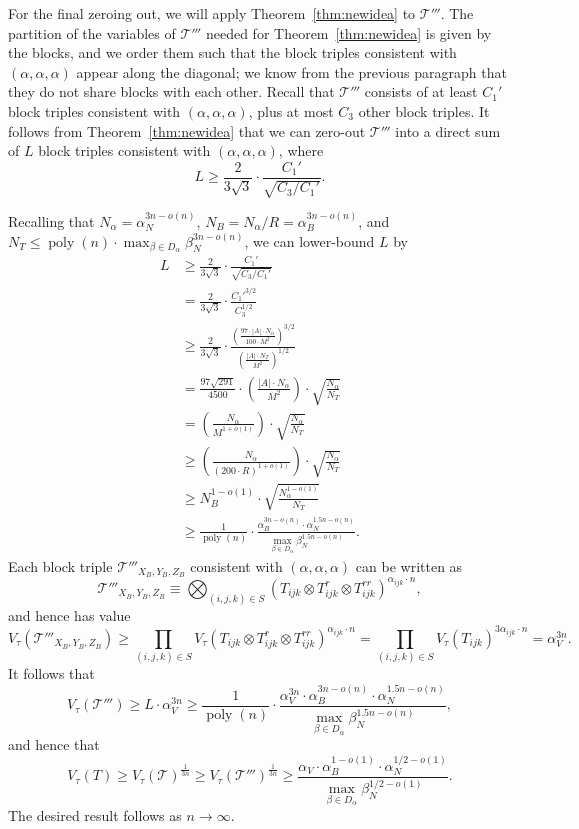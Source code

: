 \documentclass{theoretics}
\newcommand{\poly}{\mathop{\mathrm{poly}}}
\newcommand{\T}{\mathcal{T}}
\begin{document}
For the final zeroing out, we will apply Theorem~\ref{thm:newidea} to $\T'''$. The partition of the variables of $\T'''$ needed for Theorem~\ref{thm:newidea} is given by the blocks, and we order them such that the block triples consistent with $(\alpha,\alpha,\alpha)$ appear along the diagonal; we know from the previous paragraph that they do not share blocks with each other. Recall that $\T'''$ consists of at least $C_1'$ block triples consistent with $(\alpha,\alpha,\alpha)$, plus at most $C_3$ other block triples. It follows from Theorem~\ref{thm:newidea} that we can zero-out $\T'''$ into a direct sum of $L$ block triples consistent with $(\alpha,\alpha,\alpha)$, where $$L \geq\frac{2}{3 \sqrt{3}} \cdot \frac{C_1'}{\sqrt{C_3/C_1'}}.$$

Recalling that $N_\alpha = \alpha_N^{3n - o(n)}$, $N_B = N_\alpha / R = \alpha_B^{3n - o(n)}$, and $N_T \leq \poly(n) \cdot \max_{\beta \in D_\alpha} \beta_N^{3 n - o(n)}$, we can lower-bound $L$ by
\allowdisplaybreaks \begin{align*}L &\geq\frac{2}{3 \sqrt{3}} \cdot \frac{C_1'}{\sqrt{C_3/C_1'}} 
\\ &= \frac{2}{3 \sqrt{3}} \cdot \frac{C_1'^{3/2}}{C_3^{1/2}}
\\ &\geq \frac{2}{3 \sqrt{3}} \cdot \frac{\left(\frac{97 \cdot |A|\cdot N_\alpha}{100 \cdot M^{2}}\right)^{3/2}}{\left(\frac{|A| \cdot N_T}{M^2}\right)^{1/2}}
\\ &= \frac{97 \sqrt{291}}{4500} \cdot \left(\frac{|A|\cdot N_\alpha}{M^{2}}\right) \cdot \sqrt{\frac{N_\alpha}{N_T}}
\\ &= \left(\frac{N_\alpha}{M^{1+o(1)}}\right) \cdot \sqrt{\frac{N_\alpha}{N_T}}
\\ &\geq  \left(\frac{N_\alpha}{(200\cdot R)^{1+o(1)}}\right) \cdot \sqrt{\frac{N_\alpha}{N_T}}
\\ &\geq  N_B^{1 - o(1)} \cdot \sqrt{\frac{N_\alpha^{1-o(1)}}{N_T}}
\\ &\geq \frac{1}{\poly(n)} \cdot  \frac{\alpha_B^{3n - o(n)} \cdot \alpha_N^{1.5n - o(n)}}{\max_{\beta \in D_\alpha} \beta_N^{1.5 n - o(n)}}.
\end{align*}
Each block triple $\T'''_{X_B, Y_B, Z_B}$ consistent with $(\alpha,\alpha,\alpha)$ can be written as $$\T'''_{X_B, Y_B, Z_B} \equiv \bigotimes_{(i,j,k) \in S} (T_{ijk} \otimes T_{ijk}^r \otimes T_{ijk}^{rr})^{\alpha_{ijk} \cdot n},$$
and hence has value $$V_\tau(\T'''_{X_B, Y_B, Z_B}) \geq \prod_{(i,j,k) \in S} V_\tau(T_{ijk} \otimes T_{ijk}^r \otimes T_{ijk}^{rr})^{\alpha_{ijk} \cdot n} = \prod_{(i,j,k) \in S} V_\tau(T_{ijk})^{3 \alpha_{ijk} \cdot n} = \alpha_V^{3n}.$$
It follows that
$$V_\tau(\T''') \geq L \cdot \alpha_V^{3n} \geq \frac{1}{\poly(n)} \cdot  \frac{\alpha_V^{3n} \cdot \alpha_B^{3n - o(n)} \cdot \alpha_N^{1.5n - o(n)}}{\max_{\beta \in D_\alpha} \beta_N^{1.5 n - o(n)}},$$
and hence that
$$V_\tau(T) \geq V_\tau(\T)^{\frac{1}{3n}} \geq V_\tau(\T''')^{\frac{1}{3n}} \geq \frac{\alpha_V \cdot \alpha_B^{1 - o(1)} \cdot \alpha_N^{1/2 - o(1)}}{\max_{\beta \in D_\alpha} \beta_N^{1/2 - o(1)}}.$$
The desired result follows as $n \to \infty$.
\end{document}
